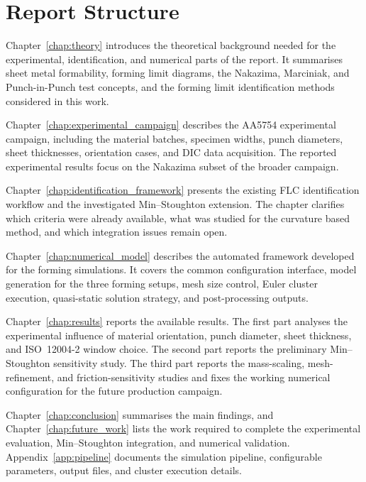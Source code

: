 \section{Report Structure}

Chapter~\ref{chap:theory} introduces the theoretical background needed for the
experimental, identification, and numerical parts of the report. It summarises
sheet metal formability, forming limit diagrams, the Nakazima, Marciniak, and
Punch-in-Punch test concepts, and the forming limit identification methods
considered in this work.

Chapter~\ref{chap:experimental_campaign} describes the AA5754 experimental
campaign, including the material batches, specimen widths, punch diameters,
sheet thicknesses, orientation cases, and DIC data acquisition. The reported
experimental results focus on the Nakazima subset of the broader campaign.

Chapter~\ref{chap:identification_framework} presents the existing FLC
identification workflow and the investigated Min--Stoughton extension. The
chapter clarifies which criteria were already available, what was studied for
the curvature based method, and which integration issues remain open.

Chapter~\ref{chap:numerical_model} describes the automated 
framework developed for the forming simulations. It covers the common
configuration interface, model generation for the three forming setups, mesh
size control, Euler cluster execution, quasi-static solution strategy, and
post-processing outputs.

Chapter~\ref{chap:results} reports the available results. The first part
analyses the experimental influence of material orientation, punch diameter,
sheet thickness, and ISO~12004-2 window choice. The second part reports the
preliminary Min--Stoughton sensitivity study. The third part reports the
mass-scaling, mesh-refinement, and friction-sensitivity studies and fixes the
working numerical configuration for the future production campaign.

Chapter~\ref{chap:conclusion} summarises the main findings, and
Chapter~\ref{chap:future_work} lists the work required to complete the
experimental evaluation, Min--Stoughton integration, and numerical validation.
Appendix~\ref{app:pipeline} documents the simulation pipeline, configurable
parameters, output files, and cluster execution details.
